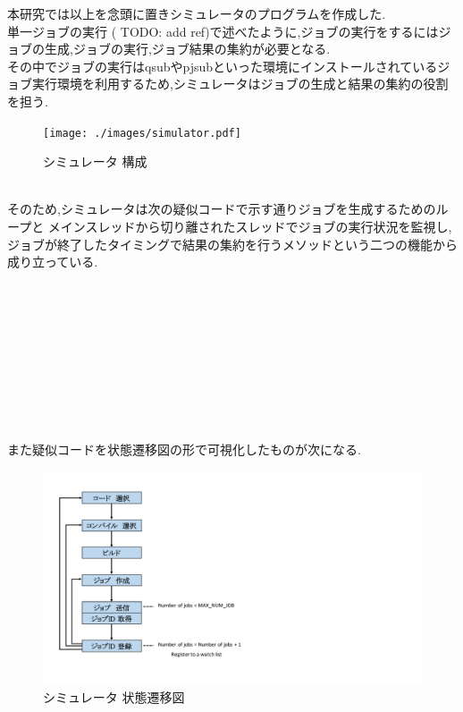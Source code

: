 本研究では以上を念頭に置きシミュレータのプログラムを作成した.\\
単一ジョブの実行 ( TODO: add ref)で述べたように,ジョブの実行をするにはジョブの生成,ジョブの実行,ジョブ結果の集約が必要となる.\\
その中でジョブの実行はqsubやpjsubといった環境にインストールされているジョブ実行環境を利用するため,シミュレータはジョブの生成と結果の集約の役割を担う.\\
\begin{figure}[htb]
  \begin{center}
    \texttt{[image: ./images/simulator.pdf]}
    \caption{シミュレータ 構成}
    \label{fig:test}
  \end{center}
\end{figure}
\\
そのため,シミュレータは次の疑似コードで示す通りジョブを生成するためのループと
メインスレッドから切り離されたスレッドでジョブの実行状況を監視し,
ジョブが終了したタイミングで結果の集約を行うメソッドという二つの機能から成り立っている.\\
\\
\\
\\
\\
\\
\\
\\
\\
\\
{\footnotesize

}
また疑似コードを状態遷移図の形で可視化したものが次になる.\\
\begin{figure}[htb]
  \begin{center}
    \includegraphics[width=20.0cm]{./images/state.pdf}
    \caption{シミュレータ 状態遷移図}
    \label{fig:test}
  \end{center}
\end{figure}
